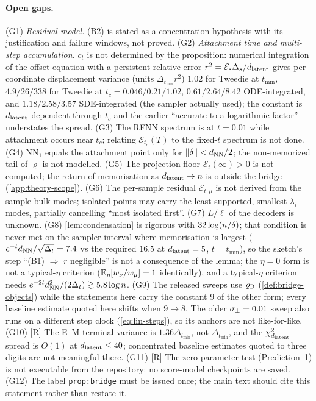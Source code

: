 \paragraph{Open gaps.}
(G1) \emph{Residual model.} (B2) is stated as a concentration hypothesis with its justification and failure windows, not proved. (G2) \emph{Attachment time and multi-step accumulation.} $c_t$ is not determined by the proposition: numerical integration of the offset equation with a persistent relative error $r^2=\mathcal E_s\Delta_s/d_{\mathrm{latent}}$ gives per-coordinate displacement variance (units $\Delta_{t_{\min}}r^2$) $1.02$ for Tweedie at $t_{\min}$, $4.9/26/338$ for Tweedie at $t_c=0.046/0.21/1.02$, $0.61/2.64/8.42$ ODE-integrated, and $1.18/2.58/3.57$ SDE-integrated (the sampler actually used); the constant is $d_{\mathrm{latent}}$-dependent through $t_c$ and the earlier ``accurate to a logarithmic factor'' understates the spread. (G3) The RFNN spectrum is at $t=0.01$ while attachment occurs near $t_c$; relating $\mathcal E_{t_c}(T)$ to the fixed-$t$ spectrum is not done. (G4) $\mathrm{NN}_1$ equals the attachment point only for $\|\delta\|<d_{\rm NN}/2$; the non-memorized tail of $\varrho$ is not modelled. (G5) The projection floor $\mathcal E_t(\infty)>0$ is not computed; the return of memorisation as $d_{\mathrm{latent}}\to n$ is outside the bridge (\cref{app:theory-scope}). (G6) The per-sample residual $\mathcal E_{t,\mu}$ is not derived from the sample-bulk modes; isolated points may carry the least-supported, smallest-$\lambda_i$ modes, partially cancelling ``most isolated first''. (G7) $L/\ell$ of the decoders is unknown. (G8) \cref{lem:condensation} is rigorous with $32\log(n/\delta)$; that condition is never met on the sampler interval where memorisation is largest ($e^{-t}d_{\rm NN}/\sqrt{\Delta_t}=7.4$ vs the required $16.5$ at $d_{\mathrm{latent}}=5$, $t=t_{\min}$), so the sketch's step ``(B1) $\Rightarrow$ $r$ negligible'' is not a consequence of the lemma; the $\eta=0$ form is not a typical-$\eta$ criterion ($\mathbb{E}_\eta[w_\nu/w_\mu]=1$ identically), and a typical-$\eta$ criterion needs $e^{-2t}d_{\rm NN}^2/(2\Delta_t)\gtrsim5.8\log n$. (G9) The released sweeps use $\varrho_{\rm B}$ (\cref{def:bridge-objects}) while the statements here carry the constant $9$ of the other form; every baseline estimate quoted here shifts when $9\to8$. The older $\sigma_{\perp}=0.01$ sweep also runs on a different step clock (\eqref{eq:lin-steps}), so its anchors are not like-for-like. (G10) [R] The E--M terminal variance is $1.36\Delta_{t_{\min}}$, not $\Delta_{t_{\min}}$, and the $\chi^2_{d_{\mathrm{latent}}}$ spread is $O(1)$ at $d_{\mathrm{latent}}\le40$; concentrated baseline estimates quoted to three digits are not meaningful there. (G11) [R] The zero-parameter test (Prediction~1) is not executable from the repository: no score-model checkpoints are saved. (G12) The label \texttt{prop:bridge} must be issued once; the main text should cite this statement rather than restate it.

